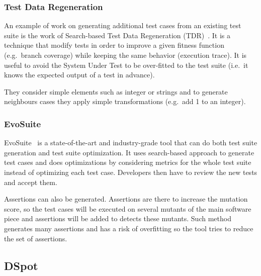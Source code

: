 \documentclass[11pt]{sdm}
\newcommand{\evosuite}{EvoSuite\xspace}
\begin{document}
\subsubsection{Test Data Regeneration}
\label{tdr}
An example of work on generating additional test cases from an existing test suite is the work of Search-based Test Data Regeneration (TDR)~\cite{yoo2012test}.
It is a technique that modify tests in order to improve a given fitness function (e.g.\ branch coverage) while keeping the same behavior (execution trace).
It is useful to avoid the System Under Test to be over-fitted to the test suite (i.e.\ it knows the expected output of a test in advance).

They consider simple elements such as integer or strings and to generate neighbours cases they apply simple transformations (e.g.\ add 1 to an integer).

\subsubsection{EvoSuite}
\label{evosuite}
\evosuite{}~\cite{fraser2011evosuite} is a state-of-the-art and industry-grade tool that can do both test suite generation and test suite optimization.
It uses search-based approach to generate test cases and does optimizations by considering metrics for the whole test suite instead of optimizing each test case.
Developers then have to review the new tests and accept them.

Assertions can also be generated.
Assertions are there to increase the mutation score, so the test cases will be executed on several mutants of the main software piece and assertions will be added to detects these mutants.
Such method generates many assertions and has a risk of overfitting so the tool tries to reduce the set of assertions.


\subsection{DSpot}
\label{testsuite_eval}
\end{document}
